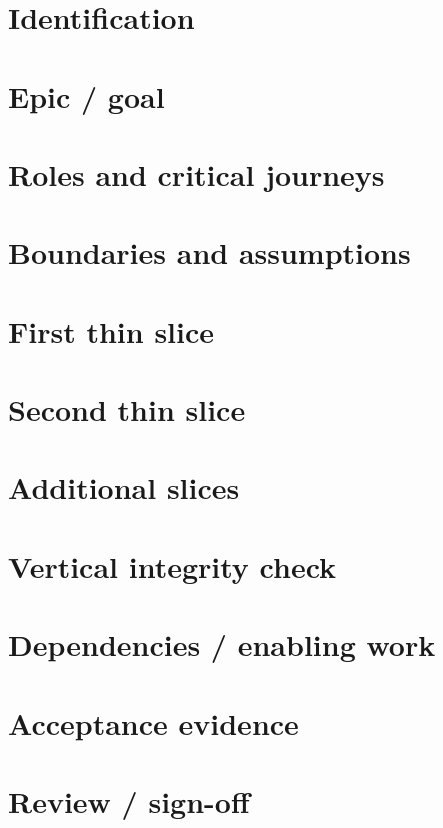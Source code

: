 \documentclass[11pt,letterpaper]{article}
\begin{document}
\section{Identification}
\section{Epic / goal}
\section{Roles and critical journeys}
\section{Boundaries and assumptions}
\section{First thin slice}
\section{Second thin slice}
\clearpage
\section{Additional slices}
\section{Vertical integrity check}
\section{Dependencies / enabling work}
\section{Acceptance evidence}
\clearpage
\section{Review / sign-off}
\end{document}
